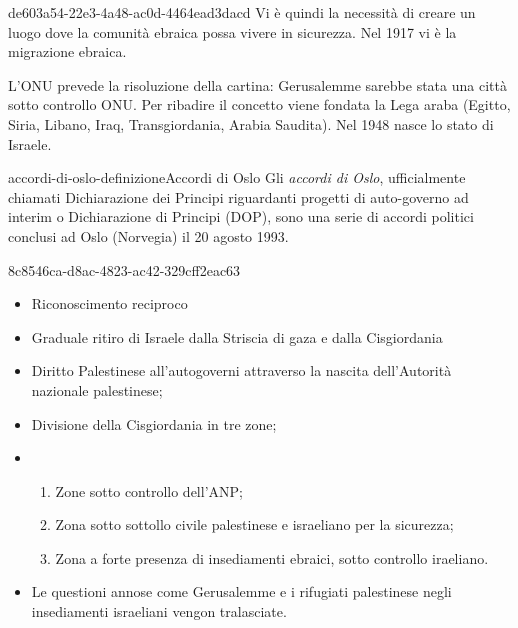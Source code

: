 \documentclass[preview]{standalone}
\begin{document}
\begin{snippet}{de603a54-22e3-4a48-ac0d-4464ead3dacd}
    Vi è quindi la necessità di creare un luogo dove la comunità ebraica possa vivere in sicurezza.
    Nel 1917 vi è la migrazione ebraica.
    
    L'ONU prevede la risoluzione della cartina:
    Gerusalemme sarebbe stata una città sotto controllo ONU.
    Per ribadire il concetto viene fondata la Lega araba
    (Egitto, Siria, Libano, Iraq, Transgiordania, Arabia Saudita).
    Nel 1948 nasce lo stato di Israele. 
    
\end{snippet}

\begin{snippetdefinition}{accordi-di-oslo-definizione}{Accordi di Oslo}
    Gli \textit{accordi di Oslo}, ufficialmente chiamati Dichiarazione dei
    Principi riguardanti progetti di auto-governo ad interim o
    Dichiarazione di Principi (DOP), sono una serie di accordi
    politici conclusi ad Oslo (Norvegia) il 20 agosto 1993.
\end{snippetdefinition}

\begin{snippet}{8c8546ca-d8ac-4823-ac42-329cff2eac63}
    \begin{itemize}
        \item Riconoscimento reciproco
        \item Graduale ritiro di Israele dalla Striscia di gaza e dalla Cisgiordania
        \item Diritto Palestinese all'autogoverni attraverso la nascita dell'Autorità nazionale palestinese;
        \item Divisione della Cisgiordania in tre zone;
        \item \begin{enumerate}
            \item Zone sotto controllo dell'ANP;
            \item Zona sotto sottollo civile palestinese e israeliano per la sicurezza;
            \item Zona a forte presenza di insediamenti ebraici, sotto controllo iraeliano.
        \end{enumerate}
        \item Le questioni annose come Gerusalemme e i rifugiati palestinese negli insediamenti israeliani vengon tralasciate.
    \end{itemize}
\end{snippet}
\end{document}
